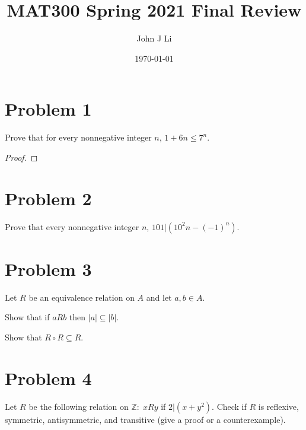 \documentclass{article}
\title{MAT300 Spring 2021 Final Review}
\date{\today}
\author{John J Li}
\begin{document}
    \maketitle
    \thispagestyle{empty}


    \section*{Problem 1}

    Prove that for every nonnegative integer $n$, $1+6n\leq 7^n$.

    \begin{proof}
        
    \end{proof}


    \section*{Problem 2}

    Prove that every nonnegative integer $n$, $101|(10^2n-(-1)^n)$.
    

    \section*{Problem 3}

    Let $R$ be an equivalence relation on $A$ and let $a,b \in A$.

    Show that if $aRb$ then $|a|\subseteq |b|$.

    Show that $R\circ R\subseteq R$.


    \section*{Problem 4}

    Let $R$ be the following relation on $\mathbb{Z}:\; xRy$ if $2|(x+y^2)$. Check if 
    $R$ is reflexive, symmetric, antisymmetric, and transitive (give a proof or a 
    counterexample).

\end{document}

